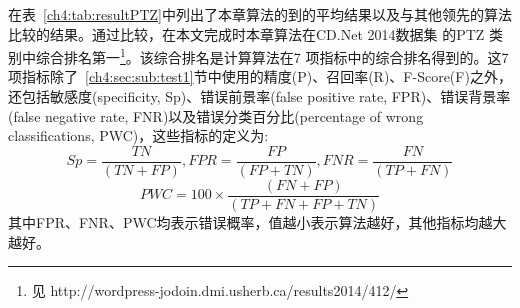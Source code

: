  在表~\ref{ch4:tab:resultPTZ}中列出了本章算法的到的平均结果以及与其他领先的算法比较的结果。通过比较，在本文完成时本章算法在CD.Net 2014数据集\cite{CD2014} 的PTZ 类别中综合排名第一\footnote{见 http://wordpress-jodoin.dmi.usherb.ca/results2014/412/}。该综合排名是计算算法在7 项指标中的综合排名得到的。这7项指标除了~\ref{ch4:sec:sub:test1}节中使用的精度(P)、召回率(R)、F-Score(F)之外，还包括敏感度(specificity, Sp)、错误前景率(false positive rate, FPR)、错误背景率(false negative rate, FNR)以及错误分类百分比(percentage of wrong classifications, PWC)，这些指标的定义为:
 $$ Sp = \frac{TN}{(TN + FP)},FPR = \frac{FP}{(FP+TN)}, FNR = \frac{FN}{(TP+FN)} $$
 $$ PWC = 100 \times \frac{(FN+FP)}{(TP+FN+FP+TN)} $$
 其中FPR、FNR、PWC均表示错误概率，值越小表示算法越好，其他指标均越大越好。
 \begin{table}[ht]
\caption{CD.Net 2014数据集\cite{CD2014}中的PTZ分类视频处理结果比较}
\label{ch4:tab:resultPTZ}
\end{table}

